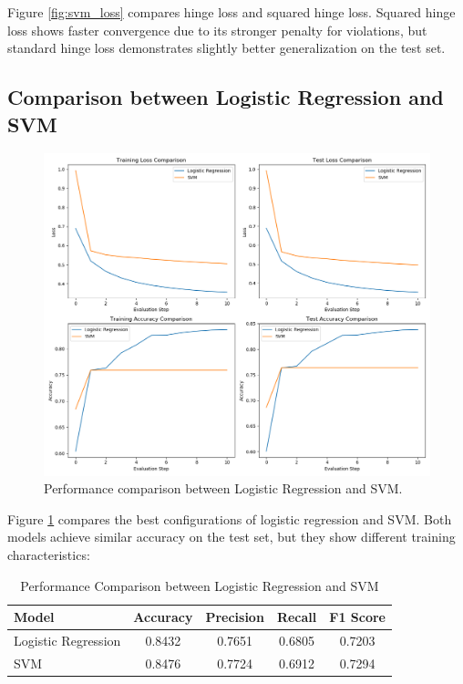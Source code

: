 \documentclass[journal, a4paper]{IEEEtran}
\begin{document}
Figure \ref{fig:svm_loss} compares hinge loss and squared hinge loss. Squared hinge loss shows faster convergence due to its stronger penalty for violations, but standard hinge loss demonstrates slightly better generalization on the test set.

\subsection{Comparison between Logistic Regression and SVM}

\begin{figure}[htbp]
\centering
\includegraphics[width=\linewidth]{lr_vs_svm_comparison.png}
\caption{Performance comparison between Logistic Regression and SVM.}
\label{fig:lr_vs_svm}
\end{figure}

Figure \ref{fig:lr_vs_svm} compares the best configurations of logistic regression and SVM. Both models achieve similar accuracy on the test set, but they show different training characteristics:

\begin{table}[htbp]
\centering
\caption{Performance Comparison between Logistic Regression and SVM}
\label{tab:comparison}
\begin{tabular}{lcccc}
\toprule
\textbf{Model} & \textbf{Accuracy} & \textbf{Precision} & \textbf{Recall} & \textbf{F1 Score} \\
\midrule
Logistic Regression & 0.8432 & 0.7651 & 0.6805 & 0.7203 \\
SVM & 0.8476 & 0.7724 & 0.6912 & 0.7294 \\
\bottomrule
\end{tabular}
\end{table}
\end{document}
